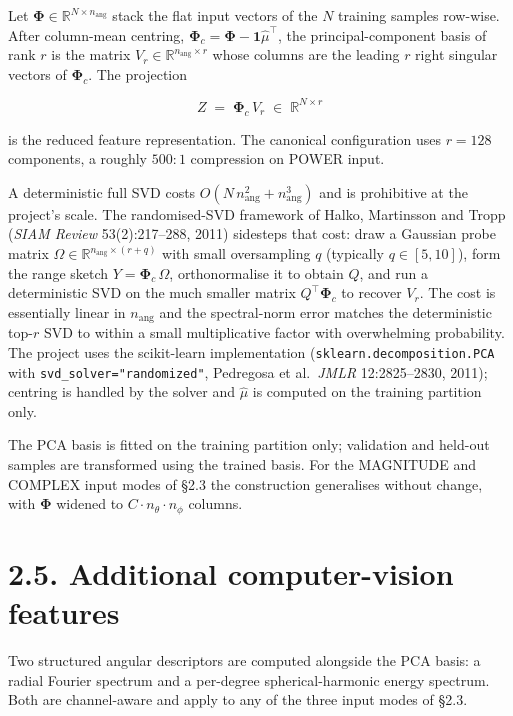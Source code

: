 \documentclass[
  english,
  11pt,
]{report}
\begin{document}
Let \(\boldsymbol\Phi \in \mathbb{R}^{N \times n_\mathrm{ang}}\) stack
the flat input vectors of the \(N\) training samples row-wise. After
column-mean centring,
\(\boldsymbol\Phi_c = \boldsymbol\Phi - \mathbf{1}\hat\mu^\top\), the
principal-component basis of rank \(r\) is the matrix
\(V_r \in \mathbb{R}^{n_\mathrm{ang}\times r}\) whose columns are the
leading \(r\) right singular vectors of \(\boldsymbol\Phi_c\). The
projection

\[
Z\;=\;\boldsymbol\Phi_c\,V_r\;\in\;\mathbb{R}^{N\times r}
\]

is the reduced feature representation. The canonical configuration uses
\(r = 128\) components, a roughly \(500{:}1\) compression on POWER
input.

A deterministic full SVD costs
\(O(N\,n_\mathrm{ang}^2 + n_\mathrm{ang}^3)\) and is prohibitive at the
project's scale. The randomised-SVD framework of Halko, Martinsson and
Tropp (\emph{SIAM Review} 53(2):217--288, 2011) sidesteps that cost:
draw a Gaussian probe matrix
\(\Omega \in \mathbb{R}^{n_\mathrm{ang}\times (r + q)}\) with small
oversampling \(q\) (typically \(q \in [5, 10]\)), form the range sketch
\(Y = \boldsymbol\Phi_c\,\Omega\), orthonormalise it to obtain \(Q\),
and run a deterministic SVD on the much smaller matrix
\(Q^\top \boldsymbol\Phi_c\) to recover \(V_r\). The cost is essentially
linear in \(n_\mathrm{ang}\) and the spectral-norm error matches the
deterministic top-\(r\) SVD to within a small multiplicative factor with
overwhelming probability. The project uses the scikit-learn
implementation (\texttt{sklearn.decomposition.PCA} with
\texttt{svd\_solver="randomized"}, Pedregosa et al.~\emph{JMLR}
12:2825--2830, 2011); centring is handled by the solver and \(\hat\mu\)
is computed on the training partition only.

The PCA basis is fitted on the training partition only; validation and
held-out samples are transformed using the trained basis. For the
MAGNITUDE and COMPLEX input modes of §2.3 the construction generalises
without change, with \(\boldsymbol\Phi\) widened to
\(C\cdot n_\theta\cdot n_\phi\) columns.

\section{2.5. Additional computer-vision
features}\label{additional-computer-vision-features}

Two structured angular descriptors are computed alongside the PCA basis:
a radial Fourier spectrum and a per-degree spherical-harmonic energy
spectrum. Both are channel-aware and apply to any of the three input
modes of §2.3.
\end{document}
